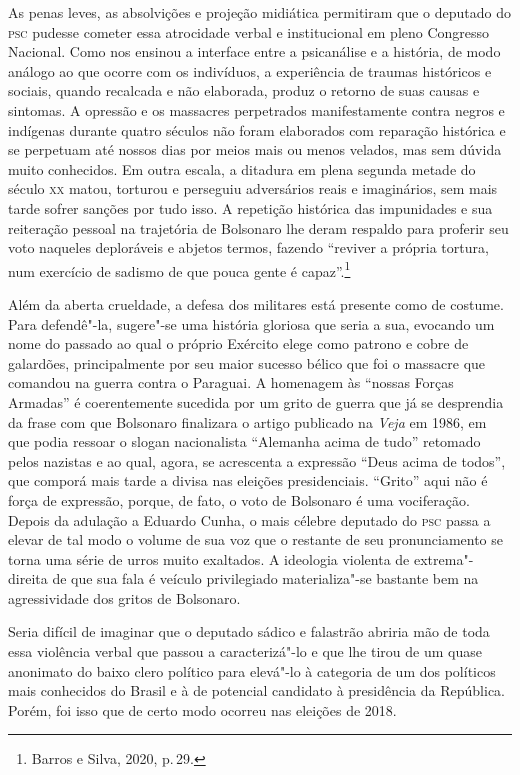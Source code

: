 As penas leves, as absolvições e projeção midiática permitiram que o
deputado do \textsc{psc} pudesse cometer essa atrocidade verbal e institucional
em pleno Congresso Nacional. Como nos ensinou a interface entre a
psicanálise e a história, de modo análogo ao que ocorre com os
indivíduos, a experiência de traumas históricos e sociais, quando
recalcada e não elaborada, produz o retorno de suas causas e sintomas. A
opressão e os massacres perpetrados manifestamente contra negros e
indígenas durante quatro séculos não foram elaborados com reparação
histórica e se perpetuam até nossos dias por meios mais ou menos
velados, mas sem dúvida muito conhecidos. Em outra escala, a ditadura em
plena segunda metade do século \textsc{xx} matou, torturou e perseguiu
adversários reais e imaginários, sem mais tarde sofrer sanções por tudo
isso. A repetição histórica das impunidades e sua reiteração pessoal na
trajetória de Bolsonaro lhe deram respaldo para proferir seu voto
naqueles deploráveis e abjetos termos, fazendo ``reviver a própria
tortura, num exercício de sadismo de que pouca gente é capaz''.\footnote{Barros
  e Silva, 2020, p.\,29.}

Além da aberta crueldade, a defesa dos militares está presente como de
costume. Para defendê"-la, sugere"-se uma história gloriosa que seria a
sua, evocando um nome do passado ao qual o próprio Exército elege como
patrono e cobre de galardões, principalmente por seu maior sucesso
bélico que foi o massacre que comandou na guerra contra o Paraguai. A
homenagem às ``nossas Forças Armadas'' é coerentemente sucedida por um
grito de guerra que já se desprendia da frase com que Bolsonaro
finalizara o artigo publicado na \emph{Veja} em 1986, em que podia
ressoar o slogan nacionalista ``Alemanha acima de tudo'' retomado pelos
nazistas e ao qual, agora, se acrescenta a expressão ``Deus acima de
todos'', que comporá mais tarde a divisa nas eleições presidenciais.
``Grito'' aqui não é força de expressão, porque, de fato, o voto de
Bolsonaro é uma vociferação. Depois da adulação a Eduardo Cunha, o mais
célebre deputado do \textsc{psc} passa a elevar de tal modo o volume de sua voz
que o restante de seu pronunciamento se torna uma série de urros muito
exaltados. A ideologia violenta de extrema"-direita de que sua fala é
veículo privilegiado materializa"-se bastante bem na agressividade dos
gritos de Bolsonaro.

Seria difícil de imaginar que o deputado sádico e falastrão abriria mão
de toda essa violência verbal que passou a caracterizá"-lo e que lhe
tirou de um quase anonimato do baixo clero político para elevá"-lo à
categoria de um dos políticos mais conhecidos do Brasil e à de potencial
candidato à presidência da República. Porém, foi isso que de certo modo
ocorreu nas eleições de 2018.

